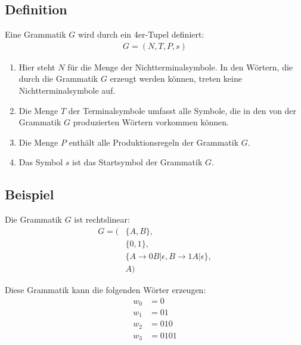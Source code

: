 \subsection{Definition}
\begin{flushleft}
Eine Grammatik $G$ wird durch ein 4er-Tupel definiert:
\begin{align}
    G=\left(N,T,P,s\right)
\end{align}

\begin{enumerate}
    \item {
        Hier steht $N$ für die Menge der Nichtterminalsymbole.
        In den Wörtern, die durch die Grammatik $G$ erzeugt werden
        können, treten keine Nichtterminalsymbole auf.
    }
    \item {
        Die Menge $T$ der Terminalsymbole umfasst alle Symbole, die
        in den von der Grammatik $G$ produzierten Wörtern vorkommen können.
    }
    \item {
        Die Menge $P$ enthält alle Produktionsregeln der Grammatik $G$.
    }
    \item {
        Das Symbol $s$ ist das Startsymbol der Grammatik $G$.
    }
\end{enumerate}
\end{flushleft}


\subsection{Beispiel}
\begin{flushleft}
Die Grammatik $G$ ist rechtslinear:
\begin{align}
    G=(&\{A,B\},\\
    &\{0,1\},\\
    &\{A\rightarrow 0B|\epsilon,B\rightarrow 1A|\epsilon\},\\
    &A)
\end{align}

Diese Grammatik kann die folgenden Wörter erzeugen:
\begin{align}
    w_0&=0 \\
    w_1&=01 \\
    w_2&=010 \\
    w_3&=0101
\end{align}
\end{flushleft}
